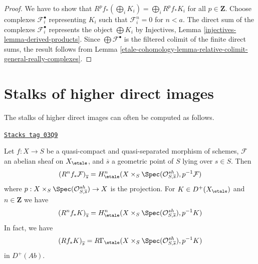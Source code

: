 \begin{proof}
We have to show that $R^pf_*(\bigoplus_i K_i) =
\bigoplus_i R^pf_*K_i$ for all $p \in \mathbf{Z}$.
Choose complexes $\mathcal{F}_i^\bullet$ representing $K_i$
such that $\mathcal{F}_i^n = 0$ for $n < a$.
The direct sum of the complexes $\mathcal{F}_i^\bullet$
represents the object $\bigoplus K_i$ by
Injectives, Lemma \ref{injectives-lemma-derived-products}.
Since $\bigoplus \mathcal{F}^\bullet$ is the filtered
colimit of the finite direct sums, the result follows
from Lemma \ref{etale-cohomology-lemma-relative-colimit-general-really-complexes}.
\end{proof}

\section{Stalks of higher direct images}
\label{etale-cohomology-section-stalks-direct-image}
The stalks of higher direct images can often be computed as follows.

\begin{theorem}
\label{etale-cohomology-theorem-higher-direct-images}
\href{https://stacks.math.columbia.edu/tag/03Q9}{\texttt{Stacks tag 03Q9}}

Let $f: X \to S$ be a quasi-compact and quasi-separated morphism of schemes,
$\mathcal{F}$ an abelian sheaf on $X_\etale$, and $\overline{s}$ a
geometric point of $S$ lying over $s \in S$. Then
$$
\left(R^nf_* \mathcal{F}\right)_{\overline{s}} =
H_\etale^n( X \times_S \Spec(\mathcal{O}_{S, \overline{s}}^{sh}),
p^{-1}\mathcal{F})
$$
where $p : X \times_S \Spec(\mathcal{O}_{S, \overline{s}}^{sh}) \to X$
is the projection. For $K \in D^+(X_\etale)$ and $n \in \mathbf{Z}$
we have
$$
\left(R^nf_*K\right)_{\overline{s}} =
H_\etale^n(X \times_S \Spec(\mathcal{O}_{S, \overline{s}}^{sh}), p^{-1}K)
$$
In fact, we have
$$
\left(Rf_*K\right)_{\overline{s}}
=
R\Gamma_\etale(X \times_S \Spec(\mathcal{O}_{S, \overline{s}}^{sh}), p^{-1}K)
$$
in $D^+(\textit{Ab})$.
\end{theorem}

